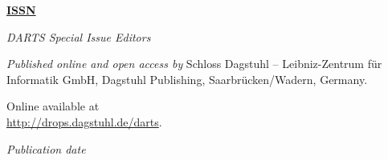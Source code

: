 \documentclass[a4paper,UKenglish]{dartsmaster-v2019}
\begin{document}
\frontmatter


\maketitle


\begin{publicationinfo}%
\sffamily
\twocolumn

{\Large\bf\sffamily \textbf{\href{http://www.dagstuhl.de/lites}{ISSN \printISSN{}}}}

\bigskip

\newcommand{\orcid}[1]{\url{http://orcid.org/#1}}
\newcommand{\email}[1]{\href{mailto:#1}{\texttt{#1}}}

\emph{DARTS Special Issue Editors} \\[0.2cm]
\printEditorLong

\bigskip

\emph{Published online and open access by}\newline
Schloss Dagstuhl -- Leibniz-Zentrum f\"ur Informatik GmbH, Dagstuhl Publishing, Saarbr\"ucken/Wadern, Germany.

Online available at \\ \url{http://drops.dagstuhl.de/darts}.

\bigskip
\emph{Publication date}\newline
\printDatePublished{}



\bigskip


\bigskip


\end{publicationinfo}
\end{document}
